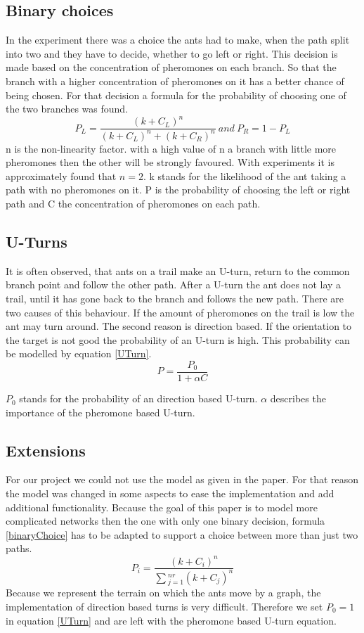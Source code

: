  \subsection{Binary choices}
 In the experiment there was a choice the ants had to make, when the path split into two and they have to decide, whether to go left or right. This decision is made based on the concentration of pheromones on each branch. So that the branch with a higher concentration of pheromones on it has a better chance of being chosen. For that decision a formula for the probability of choosing one of the two branches was found.
  \begin{equation} \label{binaryChoice}
 P_L = \frac{(k+C_L)^n}{(k+C_L)^n+(k+C_R)^n} \ and \  P_R = 1-P_L
 \end{equation}
 n is the non-linearity factor. with a high value of n a branch with little more pheromones then the other will be strongly favoured. With experiments it is approximately found that $n=2$. k stands for the likelihood of the ant taking a path with no pheromones on it. P is the probability of choosing the left or right path and C the concentration of pheromones on each path. 
 \subsection{U-Turns}
 It is often observed, that ants on a trail make an U-turn, return to the common branch point and follow the other path. After a U-turn the ant does not lay a trail, until it has gone back to the branch and follows the new path. There are two causes of this behaviour. If the amount of pheromones on the trail is low the ant may turn around. The second reason is direction based. If the orientation to the target is not good the probability of an U-turn is high. This probability can be modelled by equation \ref{UTurn}. \citep{camazine2003}
\begin{equation} \label{UTurn}
 P=\frac{P_0}{1+\alpha C}
\end{equation}

$P_0$ stands for the probability of an direction based U-turn. $\alpha$ describes the importance of the pheromone based U-turn.
\subsection{Extensions}
 For our project we could not use the model as given in the paper. For that reason the model was changed in some aspects to ease the implementation and add additional functionality. Because the goal of this paper is to model more complicated networks then the one with only one binary decision, formula \ref{binaryChoice} has to be adapted to support a choice between more than just two paths. 
\begin{equation} \label{multiDecisions}
P_i = \frac{(k+C_i)^n}{\sum{_{j=1}^{nr}(k+C_j)^n}}
\end{equation}  
Because we represent the terrain on which the ants move by a graph, the implementation of direction based turns is very difficult. Therefore we set $P_0 = 1$ in equation \ref{UTurn} and are left with the pheromone based U-turn equation.
